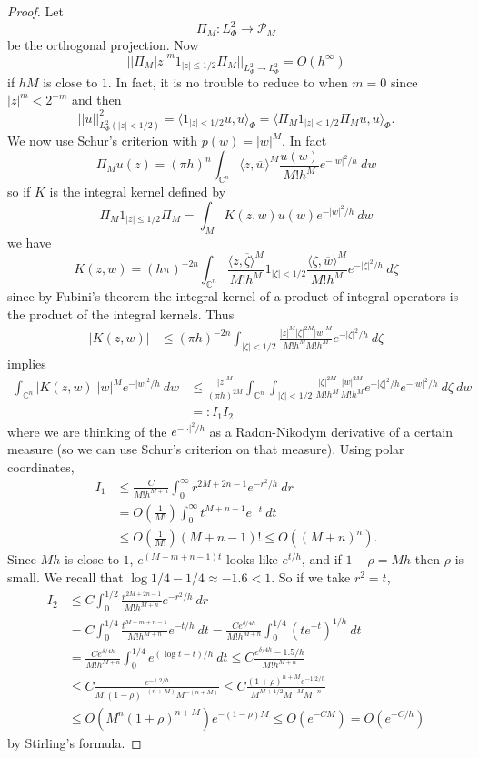 \documentclass[12pt]{report}
\newcommand{\CC}{\mathbb{C}}
\theoremstyle{definition}
\begin{document}
\begin{proof}
    Let
    $$\Pi_M: L^2_\Phi \to \mathcal P_M$$
    be the orthogonal projection. Now
    $$||\Pi_M |z|^m 1_{|z| \leq 1/2} \Pi_M||_{L^2_\Phi \to L^2_\Phi} = O(h^\infty)$$
    if $hM$ is close to $1$. In fact, it is no trouble to reduce to when $m = 0$ since $|z|^m < 2^{-m}$ and then
    $$||u||_{L^2_\Phi(|z| < 1/2)}^2 = \langle 1_{|z| < 1/2}u, u\rangle_\Phi = \langle \Pi_M 1_{|z| < 1/2}\Pi_Mu, u\rangle_\Phi.$$
    We now use Schur's criterion with $p(w) = |w|^M$. In fact
    $$\Pi_Mu(z) = (\pi h)^n \int_{\CC^n} \langle z, \overline w\rangle^M\frac{u(w)}{M!h^M} e^{-|w|^2/h} ~dw$$
    so if $K$ is the integral kernel defined by
    $$\Pi_M1_{|z|\leq 1/2}\Pi_M = \int_M K(z, w) u(w) e^{-|w|^2/h} ~dw$$
    we have
    $$K(z, w) = (h\pi)^{-2n} \int_{\CC^n} \frac{\langle z, \overline \zeta\rangle^M}{M!h^M} 1_{|\zeta|<1/2} \frac{\langle \zeta, \overline w\rangle^M}{M!h^M} e^{-|\zeta|^2/h} ~d\zeta$$
    since by Fubini's theorem the integral kernel of a product of integral operators is the product of the integral kernels. Thus
\begin{align*}|K(z, w)| &\leq (\pi h)^{-2n} \int_{|\zeta|<1/2} \frac{|z|^M|\zeta|^{2M}|w|^M}{M!h^M M!h^M} e^{-|\zeta|^2/h} ~d\zeta
\end{align*} 
    implies
\begin{align*}
    \int_{\CC^n} |K(z, w)| |w|^M e^{-|w|^2/h} ~dw &\leq \frac{|z|^M}{(\pi h)^{2M}} \int_{\CC^n} \int_{|\zeta| < 1/2} \frac{|\zeta|^{2M}}{M!h^M} \frac{|w|^{2M}}{M!h^M} e^{-|\zeta|^2/h} e^{-|w|^2/h} ~d\zeta ~dw\\
    &=: I_1I_2
\end{align*}
    where we are thinking of the $e^{-|\cdot|^2/h}$ as a Radon-Nikodym derivative of a certain measure (so we can use Schur's criterion on that measure). Using polar coordinates,
\begin{align*}I_1 &\leq \frac{C}{M!h^{M+n}} \int_0^\infty r^{2M+2n-1} e^{-r^2/h} ~dr\\
&= O\left(\frac{1}{M!}\right) \int_0^{\infty} t^{M+n-1} e^{-t} ~dt\\
&\leq O\left(\frac{1}{M!}\right) (M + n - 1)! \leq O((M + n)^n).
\end{align*}
    Since $Mh$ is close to $1$, $e^{(M+m+n-1)t}$ looks like $e^{t/h}$, and if $1 - \rho = Mh$ then $\rho$ is small. We recall that $\log 1/4 - 1/4 \approx -1.6 < 1$. So if we take $r^2 = t$,
\begin{align*}
    I_2 &\leq C\int_0^{1/2} \frac{r^{2M + 2n - 1}}{M!h^{M+n}} e^{-r^2/h} ~dr \\
    &= C\int_0^{1/4} \frac{t^{M+m+n-1}}{M!h^{M+n}} e^{-t/h} ~dt
    = \frac{Ce^{\delta/4h}}{M!h^{M+n}} \int_0^{1/4} (te^{-t})^{1/h} ~dt\\
    &= \frac{Ce^{\delta/4h}}{M!h^{M+n}} \int_0^{1/4} e^{(\log t - t)/h} ~dt
    \leq C\frac{e^{\delta/4h}-1.5/h}{M!h^{M+n}}\\
    &\leq C\frac{e^{-1.2/h}}{M!(1-\rho)^{-(n+M)}M^{-(n+M)}}
    \leq C\frac{(1+\rho)^{n+M}e^{-1.2/h}}{M^{M+1/2}M^{-M}M^{-n}}\\
    &\leq O(M^n (1 + \rho)^{n+M}) e^{-(1-\rho)M}
    \leq O(e^{-CM}) = O(e^{-C/h})
\end{align*}
    by Stirling's formula.
\end{proof}
\end{document}
